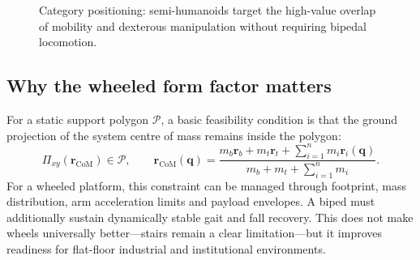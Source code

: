 \documentclass[11pt,a4paper]{article}
\begin{document}
\begin{figure}[ht]
\centering
{}
\caption{Category positioning: semi-humanoids target the high-value overlap of mobility and dexterous manipulation without requiring bipedal locomotion.}
\label{fig:positioning}
\end{figure}

\subsection{Why the wheeled form factor matters}

For a static support polygon $\mathcal{P}$, a basic feasibility condition is that the ground projection of the system centre of mass remains inside the polygon:
\begin{equation}
 \Pi_{xy}\!\left(\mathbf{r}_{\mathrm{CoM}}\right) \in \mathcal{P}, \qquad
 \mathbf{r}_{\mathrm{CoM}}(\mathbf{q})=\frac{m_b\mathbf{r}_b+m_t\mathbf{r}_t+\sum_{i=1}^{n}m_i\mathbf{r}_i(\mathbf{q})}{m_b+m_t+\sum_{i=1}^{n}m_i}.
\end{equation}
For a wheeled platform, this constraint can be managed through footprint, mass distribution, arm acceleration limits and payload envelopes. A biped must additionally sustain dynamically stable gait and fall recovery. This does not make wheels universally better---stairs remain a clear limitation---but it improves readiness for flat-floor industrial and institutional environments.
\end{document}
